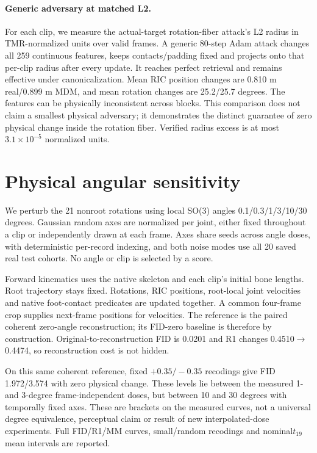 \paragraph{Generic adversary at matched L2.}
For each clip, we measure the actual-target rotation-fiber attack's L2 radius in TMR-normalized units over valid frames. A generic 80-step Adam attack changes all 259 continuous features, keeps contacts/padding fixed and projects onto that per-clip radius after every update. It reaches perfect retrieval and remains effective under canonicalization. Mean RIC position changes are 0.810 m real/0.899 m MDM, and mean rotation changes are 25.2/25.7 degrees. The features can be physically inconsistent across blocks. This comparison does not claim a smallest physical adversary; it demonstrates the distinct guarantee of zero physical change inside the rotation fiber. Verified radius excess is at most $3.1\times 10^{-5}$ normalized units.

\section{Physical angular sensitivity}

We perturb the 21 nonroot rotations using local SO(3) angles 0.1/0.3/1/3/10/30 degrees. Gaussian random axes are normalized per joint, either fixed throughout a clip or independently drawn at each frame. Axes share seeds across angle doses, with deterministic per-record indexing, and both noise modes use all 20 saved real test cohorts. No angle or clip is selected by a score.

Forward kinematics uses the native skeleton and each clip's initial bone lengths. Root trajectory stays fixed. Rotations, RIC positions, root-local joint velocities and native foot-contact predicates are updated together. A common four-frame crop supplies next-frame positions for velocities. The reference is the paired coherent zero-angle reconstruction; its FID-zero baseline is therefore by construction. Original-to-reconstruction FID is 0.0201 and R1 changes 0.4510$\to$0.4474, so reconstruction cost is not hidden.

On this same coherent reference, fixed $+0.35/-0.35$ recodings give FID 1.972/3.574 with zero physical change. These levels lie between the measured 1- and 3-degree frame-independent doses, but between 10 and 30 degrees with temporally fixed axes. These are brackets on the measured curves, not a universal degree equivalence, perceptual claim or result of new interpolated-dose experiments. Full FID/R1/MM curves, small/random recodings and nominal$t_{19}$ mean intervals are reported.

